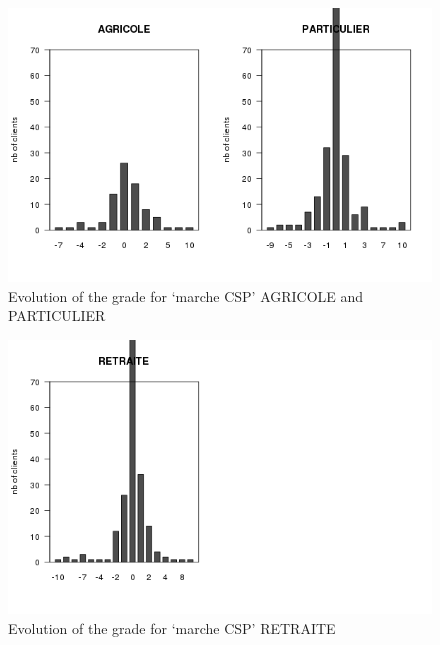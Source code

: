\documentclass[a4paper, 11pt]{article}
\begin{document}
    \begin{figure}[!ht]
            \centering
            \includegraphics[height = 10 cm]{Remi/Evolution_of_the_grade_for_marche_CSP_PARTICULIER.png}
            \caption{Evolution of the grade for `marche CSP' AGRICOLE and PARTICULIER}
            \label{fig:e_CSP_PARTICULIER}
    \end{figure}

    \begin{figure}[!ht]
            \centering
            \includegraphics[height = 10 cm]{Remi/Evolution_of_the_grade_for_marche_CSP_RETRAITE.png}
            \caption{Evolution of the grade for `marche CSP' RETRAITE}
            \label{fig:e_CSP_RETRAITE}
    \end{figure}
\end{document}

